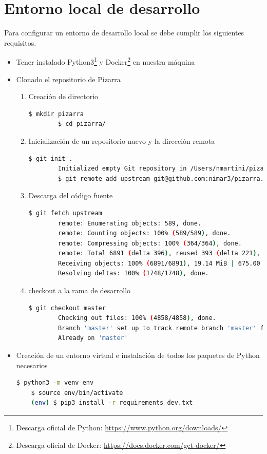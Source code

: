 \documentclass[11pt,spanish,listoffigures,listoftables]{tfgetsinf}
\begin{document}
\section{Entorno local de desarrollo}

Para configurar un entorno de desarrollo local se debe cumplir  los siguientes requisitos.

\begin{itemize}
	\item  Tener instalado Python3\footnote{Descarga oficial de Python: \url{https://www.python.org/downloads/}} y Docker\footnote{Descarga oficial de Docker: \url{https://docs.docker.com/get-docker/}} en nuestra máquina
	\item Clonado el repositorio de Pizarra
	\begin{enumerate}
		\item Creación de directorio
		\begin{lstlisting}[language=bash]
		$ mkdir pizarra
		$ cd pizarra/
		\end{lstlisting}
		\item Inicialización de un repositorio nuevo y la dirección remota
		\begin{lstlisting}[language=bash]
		$ git init .
		Initialized empty Git repository in /Users/nmartini/pizarra/.git/
		$ git remote add upstream git@github.com:nimar3/pizarra.git
		\end{lstlisting}
		\item Descarga del código fuente
		\begin{lstlisting}[language=bash]
		$ git fetch upstream
		remote: Enumerating objects: 589, done.
		remote: Counting objects: 100% (589/589), done.
		remote: Compressing objects: 100% (364/364), done.
		remote: Total 6891 (delta 396), reused 393 (delta 221), pack-reused 6302
		Receiving objects: 100% (6891/6891), 19.14 MiB | 675.00 KiB/s, done.
		Resolving deltas: 100% (1748/1748), done.
		\end{lstlisting}
		\item \foreignlanguage{english}{checkout} a la rama de desarrollo
		\begin{lstlisting}[language=bash]
		$ git checkout master
		Checking out files: 100% (4858/4858), done.
		Branch 'master' set up to track remote branch 'master' from 'upstream'.
		Already on 'master'
		\end{lstlisting}
	\end{enumerate}
	\item Creación de un entorno virtual e instalación de todos los \Gls{paquete}s de Python necesarios
	\begin{lstlisting}[language=bash]
	$ python3 -m venv env
	$ source env/bin/activate   
	(env) $ pip3 install -r requirements_dev.txt
	\end{lstlisting}
\end{itemize}
\end{document}
